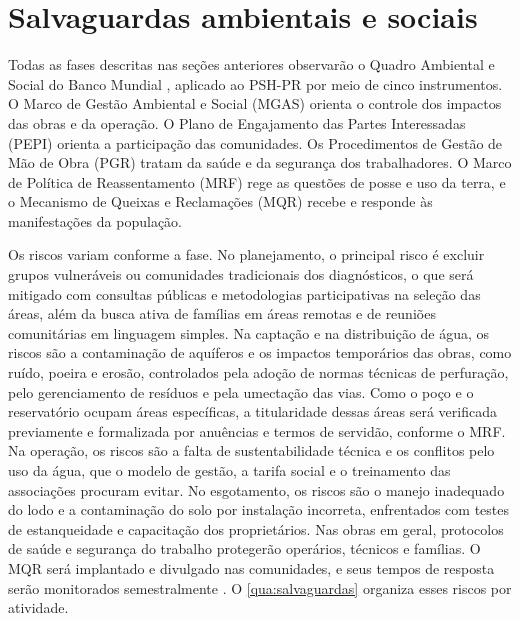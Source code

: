 \section{Salvaguardas ambientais e sociais}
\label{sec:salvaguardas}

Todas as fases descritas nas seções anteriores observarão o Quadro Ambiental
e Social do Banco Mundial \cite{bm-esf}, aplicado ao PSH-PR por meio de cinco
instrumentos. O Marco de Gestão Ambiental e Social (MGAS) orienta o controle
dos impactos das obras e da operação. O Plano de Engajamento das Partes
Interessadas (PEPI) orienta a participação das comunidades. Os Procedimentos
de Gestão de Mão de Obra (PGR) tratam da saúde e da segurança dos
trabalhadores. O Marco de Política de Reassentamento (MRF) rege as questões
de posse e uso da terra, e o Mecanismo de Queixas e Reclamações (MQR) recebe e
responde às manifestações da população.

Os riscos variam conforme a fase. No planejamento, o principal risco é
excluir grupos vulneráveis ou comunidades tradicionais dos diagnósticos, o
que será mitigado com consultas públicas e metodologias participativas na
seleção das áreas, além da busca ativa de famílias em áreas remotas e de
reuniões comunitárias em linguagem simples. Na captação e na distribuição de
água, os riscos são a contaminação de aquíferos e os impactos temporários das
obras, como ruído, poeira e erosão, controlados pela adoção de normas
técnicas de perfuração, pelo gerenciamento de resíduos e pela umectação das
vias. Como o poço e o reservatório ocupam áreas específicas, a titularidade
dessas áreas será verificada previamente e formalizada por anuências e termos
de servidão, conforme o MRF. Na operação, os riscos são a falta de
sustentabilidade técnica e os conflitos pelo uso da água, que o modelo de
gestão, a tarifa social e o treinamento das associações procuram evitar. No
esgotamento, os riscos são o manejo inadequado do lodo e a contaminação do
solo por instalação incorreta, enfrentados com testes de estanqueidade e
capacitação dos proprietários. Nas obras em geral, protocolos de saúde e
segurança do trabalho protegerão operários, técnicos e famílias. O MQR será
implantado e divulgado nas comunidades, e seus tempos de resposta serão
monitorados semestralmente \cite[Quadros 25 e 26]{mop2026}. O
\autoref{qua:salvaguardas} organiza esses riscos por atividade.

